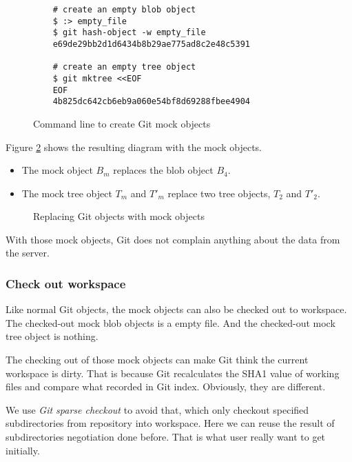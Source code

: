 \documentclass[preprint]{sigplanconf}
\begin{document}
\begin{figure}[htpb]
  \centering
  \begin{verbatim}
    # create an empty blob object
    $ :> empty_file
    $ git hash-object -w empty_file
    e69de29bb2d1d6434b8b29ae775ad8c2e48c5391

    # create an empty tree object
    $ git mktree <<EOF
    EOF
    4b825dc642cb6eb9a060e54bf8d69288fbee4904
  \end{verbatim}
  \caption{Command line to create Git mock objects}
  \label{fig:cmd-create-mock}
\end{figure}

Figure \ref{fig:mock-objects} shows the resulting diagram with the mock objects.

\begin{itemize}
  \item The mock object $B_m$ replaces the blob object $B_4$.
  \item The mock tree object $T_m$ and $T'_m$ replace two tree objects, $T_2$ and $T'_2$.
\end{itemize}

\begin{figure}[htpb]
  \centering
  
  \caption{Replacing Git objects with mock objects}
  \label{fig:mock-objects}
\end{figure}

With those mock objects, Git does not complain anything about the data from the server.

\subsubsection{Check out workspace}
Like normal Git objects, the mock objects can also be checked out to workspace.
The checked-out mock blob objects is a empty file.
And the checked-out mock tree object is nothing.

The checking out of those mock objects can make Git think the current workspace is dirty.
That is because Git recalculates the SHA1 value of working files and compare what recorded in Git index.
Obviously, they are different.

We use \emph{Git sparse checkout} \cite{sparseco} to avoid that, which only
checkout specified subdirectories from repository into workspace.
Here we can reuse the result of subdirectories negotiation done before.
That is what user really want to get initially.
\end{document}
